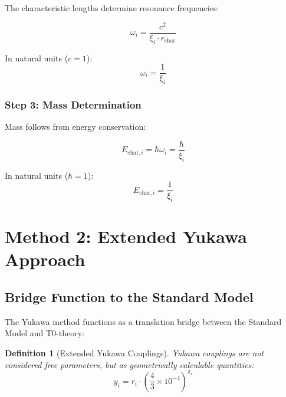 \documentclass[12pt,a4paper]{article}
\newtheorem{definition}[theorem]{Definition}
\begin{document}
	The characteristic lengths determine resonance frequencies:
	
	\begin{equation}
		\omega_i = \frac{c^2}{\xi_i \cdot r_{\text{char}}}
		\label{eq:resonance_frequencies}
	\end{equation}
	
	In natural units ($c = 1$):
	\begin{equation}
		\omega_i = \frac{1}{\xi_i}
		\label{eq:resonance_natural}
	\end{equation}
	
	\subsubsection{Step 3: Mass Determination}
	\label{subsubsec:step3}
	
	Mass follows from energy conservation:
	
	\begin{equation}
		E_{\text{char},i} = \hbar \omega_i = \frac{\hbar}{\xi_i}
		\label{eq:energy_from_frequency}
	\end{equation}
	
	In natural units ($\hbar = 1$):
	\begin{equation}
		\boxed{E_{\text{char},i} = \frac{1}{\xi_i}}
		\label{eq:characteristic_energy_direct}
	\end{equation}
	
	\section{Method 2: Extended Yukawa Approach}
	\label{sec:yukawa_method}
	
	\subsection{Bridge Function to the Standard Model}
	\label{subsec:bridge_function}
	
	The Yukawa method functions as a translation bridge between the Standard Model and T0-theory:
	
	\begin{definition}[Extended Yukawa Couplings]
		Yukawa couplings are not considered free parameters, but as geometrically calculable quantities:
		\begin{equation}
			y_i = r_i \cdot \left(\frac{4}{3} \times 10^{-4}\right)^{\pi_i}
			\label{eq:yukawa_couplings}
		\end{equation}
	\end{definition}
	
\end{document}
